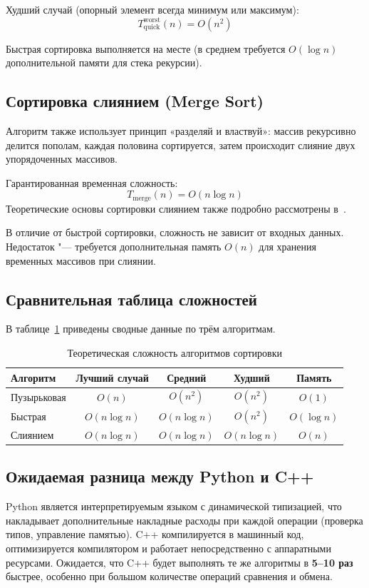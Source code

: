 Худший случай (опорный элемент всегда минимум или максимум):
\begin{equation}
    \label{eq:quick_worst}
    T_{\text{quick}}^{\text{worst}}(n) = O(n^2)
\end{equation}

Быстрая сортировка выполняется на месте (в среднем требуется $O(\log n)$ дополнительной памяти для стека рекурсии).

\subsection{Сортировка слиянием (Merge Sort)}

Алгоритм также использует принцип «разделяй и властвуй»: массив рекурсивно делится пополам, каждая половина сортируется, затем происходит слияние двух упорядоченных массивов.

Гарантированная временная сложность:
\begin{equation}
    \label{eq:merge}
    T_{\text{merge}}(n) = O(n \log n)
\end{equation}
Теоретические основы сортировки слиянием также подробно рассмотрены в~\cite{cormen2009}.

В отличие от быстрой сортировки, сложность не зависит от входных данных. Недостаток "--- требуется дополнительная память $O(n)$ для хранения временных массивов при слиянии.

\subsection{Сравнительная таблица сложностей}

В таблице~\ref{tab:complexity} приведены сводные данные по трём алгоритмам.

\begin{table}[H]
\centering
\caption{Теоретическая сложность алгоритмов сортировки}
\label{tab:complexity}
\begin{tabular}{|l|c|c|c|c|}
\hline
\textbf{Алгоритм} & \textbf{Лучший случай} & \textbf{Средний} & \textbf{Худший} & \textbf{Память} \\
\hline
Пузырьковая & $O(n)$ & $O(n^2)$ & $O(n^2)$ & $O(1)$ \\
\hline
Быстрая & $O(n \log n)$ & $O(n \log n)$ & $O(n^2)$ & $O(\log n)$ \\
\hline
Слиянием & $O(n \log n)$ & $O(n \log n)$ & $O(n \log n)$ & $O(n)$ \\
\hline
\end{tabular}
\end{table}

\subsection{Ожидаемая разница между Python и C++}

Python является интерпретируемым языком с динамической типизацией, что накладывает дополнительные накладные расходы при каждой операции (проверка типов, управление памятью). C++ компилируется в машинный код, оптимизируется компилятором и работает непосредственно с аппаратными ресурсами. Ожидается, что C++ будет выполнять те же алгоритмы в \textbf{5--10 раз} быстрее, особенно при большом количестве операций сравнения и обмена.
